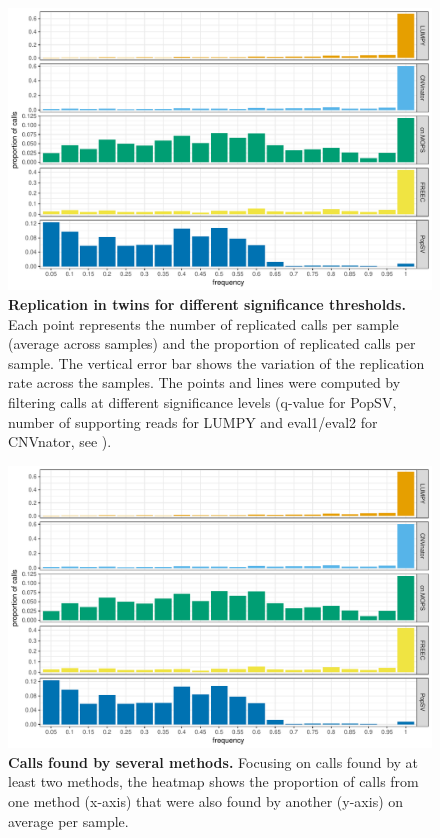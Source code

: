 \begin{figure}[htp]
  \centering
  \includegraphics[width=.8\linewidth, page=3]{figures/twin-benchmark.pdf}
  \caption[Replication in twins for different significance thresholds]{{\bf Replication in twins for different significance thresholds.} {\small Each point represents the number of replicated calls per sample (average across samples) and the proportion of replicated calls per sample. The vertical error bar shows the variation of the replication rate across the samples. The points and lines were computed by filtering calls at different significance levels (q-value for {\sf PopSV}, number of supporting reads for {\sf LUMPY} and eval1/eval2 for {\sf CNVnator}, see ).}}
  \label{fig:twinconcsig}
\end{figure}

\begin{figure}[htp]
  \centering
  \includegraphics[width=.9\linewidth, page=4]{figures/twin-benchmark.pdf}
  \caption[Calls found by several methods]{{\bf Calls found by several methods.} {\small Focusing on calls found by at least two methods, the heatmap shows the proportion of calls from one method (x-axis) that were also found by another (y-axis) on average per sample.}}
  \label{fig:twincallcomp}
\end{figure}


